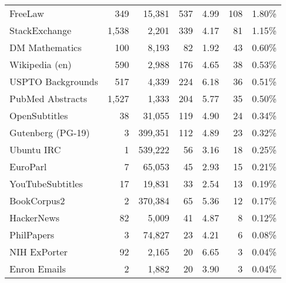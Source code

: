 \begin{table}[!h]
\begin{tabularx}{\textwidth}{lrrrrrr}
		FreeLaw             & 349              & 15,381         & 537             & 4.99          & 108            & 1.80\%            \\
		StackExchange       & 1,538            & 2,201          & 339             & 4.17          & 81             & 1.15\%            \\
		DM Mathematics      & 100              & 8,193          & 82              & 1.92          & 43             & 0.60\%            \\
		Wikipedia (en)      & 590              & 2,988          & 176             & 4.65          & 38             & 0.53\%            \\
		USPTO Backgrounds   & 517              & 4,339          & 224             & 6.18          & 36             & 0.51\%            \\
		PubMed Abstracts    & 1,527            & 1,333          & 204             & 5.77          & 35             & 0.50\%            \\
		OpenSubtitles       & 38               & 31,055         & 119             & 4.90          & 24             & 0.34\%            \\
		Gutenberg (PG-19)   & 3                & 399,351        & 112             & 4.89          & 23             & 0.32\%            \\
		Ubuntu IRC          & 1                & 539,222        & 56              & 3.16          & 18             & 0.25\%            \\
		EuroParl            & 7                & 65,053         & 45              & 2.93          & 15             & 0.21\%            \\
		YouTubeSubtitles    & 17               & 19,831         & 33              & 2.54          & 13             & 0.19\%            \\
		BookCorpus2         & 2                & 370,384        & 65              & 5.36          & 12             & 0.17\%            \\
		HackerNews          & 82               & 5,009          & 41              & 4.87          & 8              & 0.12\%            \\
		PhilPapers          & 3                & 74,827         & 23              & 4.21          & 6              & 0.08\%            \\
		NIH ExPorter        & 92               & 2,165          & 20              & 6.65          & 3              & 0.04\%            \\
		Enron Emails        & 2                & 1,882          & 20              & 3.90          & 3              & 0.04\%            \\

\end{tabularx}
\end{table}
